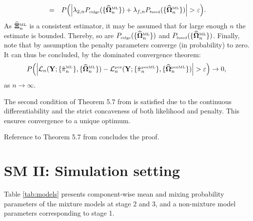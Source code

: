\documentclass[10pt]{article}
\makeatletter
\newcommand{\proofname}{Proof.}
\newcounter{proof}\newcounter{currproofctr}\newcounter{endproofctr}%
\newenvironment{proof}[1][\proofname]{
  \th@nonumberplain
  \def\theorem@headerfont{\itshape}%
  \normalfont
  \@thm{proof}{proof}{#1}}%
  {\@endtheorem}
\makeatother
\begin{document}
\begin{proof}
\begin{eqnarray*}
\\
& = & P \Big( \Big| \lambda_{2,n} P_{\mbox{{\tiny ridge}}}( \{\widehat{\mathbf{\Omega}}_n^{\mbox{{\tiny ML}}} \}) + \lambda_{f,n} P_{\mbox{{\tiny fused}}}( \{\widehat{\mathbf{\Omega}}_n^{\mbox{{\tiny ML}}} \}) \Big| > \varepsilon \Big).
\end{eqnarray*}
As $\widehat{\mathbf{\Xi}}_n^{\mbox{{\tiny ML}}}$ is a consistent estimator, it may be assumed that for large enough $n$ the estimate is bounded. Thereby, so are $P_{\mbox{{\tiny ridge}}}( \{\widehat{\mathbf{\Omega}}_n^{\mbox{{\tiny ML}}} \})$ and $P_{\mbox{{\tiny fused}}}( \{\widehat{\mathbf{\Omega}}_n^{\mbox{{\tiny ML}}} \})$. Finally, note that by assumption the penalty parameters converge (in probability) to zero. It can thus be concluded, by the dominated convergence theorem:
\begin{eqnarray*}
P \Big( \Big| \mathcal{L}_n (\mathbf{Y}; \{ \hat{\pi}_n^{\mbox{{\tiny ML}}} \}, \{ \widehat{\mathbf{\Omega}}_n^{\mbox{{\tiny ML}}} \} ) - \mathcal{L}_n^{\mbox{{\tiny pen}} }(\mathbf{Y}; \{ \hat{\pi}_n^{\mbox{{\tiny penML}}} \}, \{\widehat{\mathbf{\Omega}}_n^{\mbox{{\tiny penML}}} \} ) \Big| > \varepsilon  \Big) \rightarrow 0,
\end{eqnarray*}
as $n \rightarrow \infty$.

The second condition of Theorem 5.7 from \cite{VdVa2000} is satisfied due to the continuous differentiability and the strict concaveness of both likelihood and penalty. This ensures convergence to a unique optimum.

Reference to  Theorem 5.7 from \cite{VdVa2000} concludes the proof.
\end{proof}
\setlength{\bibsep}{2pt}


\newpage
\section*{SM II: Simulation setting}
\label{SMII}

Table \ref{tab:models} presents component-wise mean and mixing probability parameters of the mixture models at stage 2 and 3, and a non-mixture model parameters corresponding to stage 1. 
\end{document}
